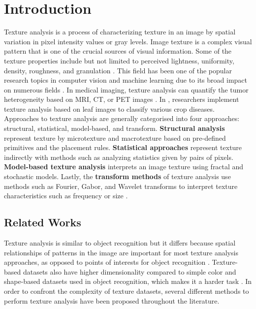 \documentclass[10pt,twocolumn,letterpaper]{article}
\begin{document}

\section{Introduction}
 Texture analysis is a process of characterizing texture in an image by spatial variation in pixel intensity values or gray levels. Image texture is a complex visual pattern that is one of the crucial sources of visual information. Some of the texture properties include but not limited to perceived lightness, uniformity, density, roughness, and granulation \cite{Materka98textureanalysis}. This field has been one of the popular research topics in computer vision and machine learning due to its broad impact on numerous fields \cite{Cavalin2017methods}. In medical imaging, texture analysis can quantify the tumor heterogeneity based on MRI, CT, or PET images \cite{Nalepa2014medical}.  In \cite{Pinto2016agri}, researchers implement texture analysis based on leaf images to classify various crop diseases.
\\

 Approaches to texture analysis are generally categorised into four approaches: structural, statistical, model-based, and transform. {\bf Structural analysis} represent texture by microtexture and macrotexture based on pre-defined primitives and the placement rules. {\bf Statistical approaches} represent texture indirectly with methods such as analyzing statistics given by pairs of pixels. {\bf Model-based texture analysis} interprets an image texture using fractal and stochastic models. Lastly, the {\bf transform methods} of texture analysis use methods such as Fourier, Gabor, and Wavelet transforms to interpret texture characteristics such as frequency or size \cite{Materka98textureanalysis}.




\subsection{Related Works}


\par Texture analysis is similar to object recognition but it differs because spatial relationships of patterns in the image are important for most texture analysis approaches, as opposed to points of interests for object recognition \cite{Cavalin2017methods}. Texture-based datasets also have higher dimensionality compared to simple color and shape-based datasets used in object recognition, which makes it a harder task \cite{Basu2018deeptexture}. In order to confront the complexity of texture datasets, several different methods to perform texture analysis have been proposed throughout the literature.
\\
\end{document}
